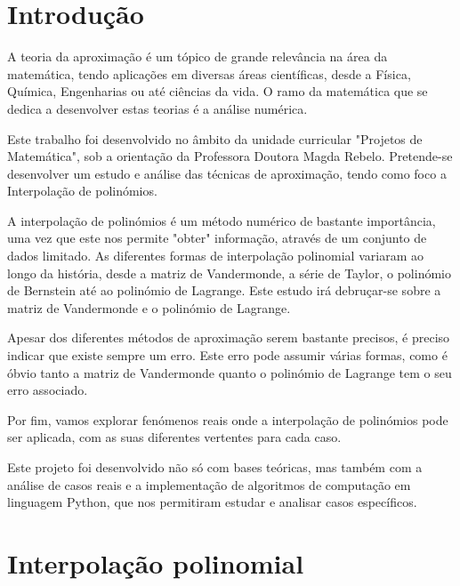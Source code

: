 \documentclass[12pt]{article}
\begin{document}
\section{Introdução}
\hspace*{0.3cm}


\hspace{0.5cm}A teoria da aproximação é um tópico de grande relevância na área da matemática, tendo aplicações em diversas áreas científicas, desde a Física, Química, Engenharias ou até ciências da vida. O ramo da matemática que se dedica a desenvolver estas teorias é a análise numérica.

\hspace{0.5cm}Este trabalho foi desenvolvido no âmbito da unidade curricular "Projetos de Matemática", sob a orientação da Professora Doutora Magda Rebelo. Pretende-se desenvolver um estudo e análise das técnicas de aproximação, tendo como foco a Interpolação de polinómios.

\hspace{0.5cm}A interpolação de polinómios é um método numérico de bastante importância, uma vez que este nos permite "obter"  informação, através de um conjunto de dados limitado. As diferentes formas de interpolação polinomial variaram ao longo da história, desde a matriz de Vandermonde, a série de Taylor, o polinómio de Bernstein até ao polinómio de Lagrange. Este estudo irá debruçar-se sobre a matriz de Vandermonde e o polinómio de Lagrange.

\hspace{0.5cm}Apesar dos diferentes métodos de aproximação serem bastante precisos, é preciso indicar que existe sempre um erro. Este erro pode assumir várias formas, como é óbvio tanto a matriz de Vandermonde quanto o polinómio de Lagrange tem o seu erro associado.

\hspace{0.5cm}Por fim, vamos explorar fenómenos reais onde a interpolação de polinómios pode ser aplicada, com as suas diferentes vertentes para cada caso.

\hspace{0.5cm}Este projeto foi desenvolvido não só com bases teóricas, mas também com a análise de casos reais e a implementação de algoritmos de computação em linguagem Python, que nos permitiram estudar e analisar casos específicos.


 
\section{Interpolação polinomial}
\end{document}
